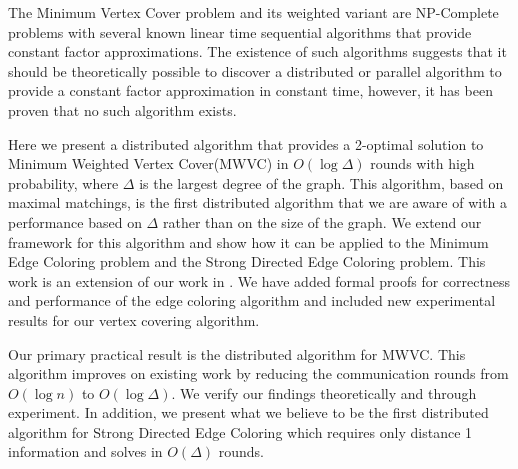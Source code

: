 The Minimum Vertex Cover problem and its weighted variant are NP-Complete problems with several known linear time sequential algorithms that provide constant factor approximations. The existence of such algorithms suggests that it should be theoretically possible to discover a distributed or parallel algorithm to provide a constant factor approximation in constant time, however, it has been proven that no such algorithm exists\cite{1011811}. 

Here we present a distributed algorithm that provides a 2-optimal solution to Minimum Weighted Vertex Cover(MWVC) in $O(\log\Delta)$ rounds with high probability, where $\Delta$ is the largest degree of the graph. This algorithm, based on maximal matchings, is the first distributed algorithm that we are aware of with a performance based on $\Delta$ rather than on the size of the graph. We extend our framework for this algorithm and show how it can be applied to the Minimum Edge Coloring problem and the Strong Directed Edge Coloring problem. This work is an extension of our work in \cite{Daigle:2011uq, Daigle:2012uq}. We have added formal proofs for correctness and performance of the edge coloring algorithm and included new experimental results for our vertex covering algorithm. 

Our primary practical result is the distributed algorithm for MWVC. This algorithm improves on existing work by reducing the communication rounds from $O(\log n)$ to $O(\log \Delta)$. We verify our findings theoretically and through experiment. In addition, we present what we believe to be the first distributed algorithm for Strong Directed Edge Coloring which requires only distance 1 information and solves in $O(\Delta)$ rounds.

